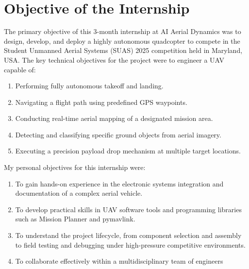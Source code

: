 \chapter{Objective of the Internship}
The primary objective of this 3-month internship at AI Aerial Dynamics was to design, develop,
and deploy a highly autonomous quadcopter to compete in the Student Unmanned Aerial Systems (SUAS) 2025 competition held in Maryland, USA.
The key technical objectives for the project were to engineer a UAV capable of:

\begin{enumerate}
	
	\item Performing fully autonomous takeoff and landing.
	\item Navigating a flight path using predefined GPS waypoints.
	\item Conducting real-time aerial mapping of a designated mission area.
	\item Detecting and classifying specific ground objects from aerial imagery.
	\item Executing a precision payload drop mechanism at multiple target locations.
\end{enumerate}
\noindent
My personal objectives for this internship were:

\begin{enumerate}
	
	\item To gain hands-on experience in the electronic systems integration and documentation of a complex aerial vehicle.
	\item To develop practical skills in UAV software tools and programming libraries such as Mission Planner and pymavlink.
	\item To understand the project lifecycle, from component selection and assembly to field testing and debugging under high-pressure competitive environments.
	\item To collaborate effectively within a multidisciplinary team of engineers
\end{enumerate}

